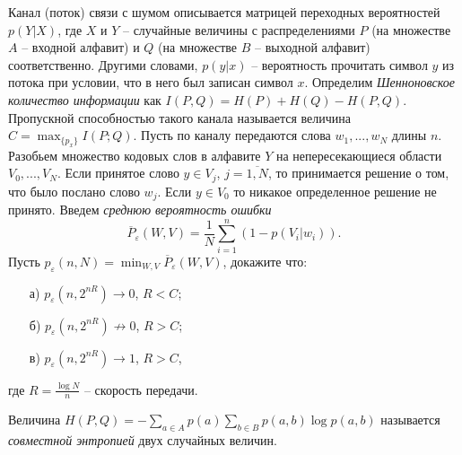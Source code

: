 \begin{problem}  

Канал (поток) связи с шумом описывается матрицей переходных вероятностей $p(Y|X)$, где $X$ и $Y$ -- случайные величины с распределениями $P$ (на множестве $A$ -- входной алфавит) и $Q$ (на множестве $B$ -- выходной алфавит) соответственно. Другими словами, $p(y|x)$ -- вероятность прочитать  символ $y$ из потока при условии, что в него был записан символ $x$.
Определим \textit{Шенноновское количество информации} как $I(P, Q) = H(P) + H(Q) - H(P,Q)$. Пропускной способностью такого канала называется величина $C= \max_{\{p_x\}}I(P;Q)$.
Пусть по каналу передаются слова $w_1,...,w_N$ длины $n$.
Разобьем множество кодовых слов в алфавите $Y$ на непересекающиеся области $V_0,...,V_N$. Если принятое слово $y \in V_j$, $j = \overline{1,N}$, то принимается решение о том, что было послано слово $w_j$. Если $y \in V_0$ то никакое определенное решение не принято. Введем \textit{среднюю вероятность ошибки} $$\overline{P}_{\varepsilon}(W, V) = \frac{1}{N} \sum_{i=1}^n (1 - p(V_i|w_i)).$$
Пусть $p_{\varepsilon}(n, N) = \min_{W, V} \overline{P}_{\varepsilon}(W, V)$, докажите что:
\begin{enumerate}
\item[а)] $p_{\varepsilon}(n, 2^{nR}) \rightarrow 0$, $R < C$;
\item[б)] $p_{\varepsilon}(n, 2^{nR}) \not\rightarrow 0$, $R > C$;
\item[в)] $p_{\varepsilon}(n, 2^{nR}) \rightarrow 1$, $R > C$,
\end{enumerate}
где $R = \frac{\log N}{n}$ -- скорость передачи.
\begin{remark}
Величина $H(P,Q) = -\sum_{a\in A} p(a)\sum_{b \in B}p(a, b)\log p(a, b)$ называется \textit{совместной энтропией} двух случайных величин.
\end{remark}
\end{problem} 
\begin{comment}
В ЗАМЕЧАНИИ ХОТЕЛОСЬ БЫ ВИДЕТЬ И СВЯЗЬ С ЗАДАЧЕЙ ПРО ГРАНИЦУ ГИЛБЕРТА, ГДЕ ИСПОЛЬЗУЕТС ЯСЛУЧАЙНОЕ КОДИРОВАНИЕ
ПОЛЕЗНО ЗДЕСЬ ЖЕ ОБЫГРАТЬ СТР, 133 теорему 10.11 Верещагин Щепин

Вообще стоит подробнее в заадчах осветить главу 11 этой книги!
\end{comment}


